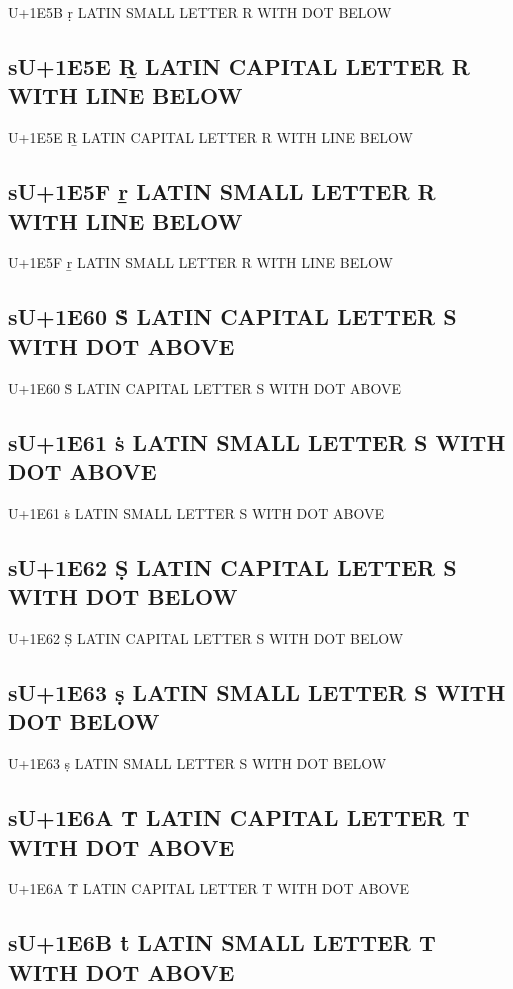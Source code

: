 U+1E5B ṛ LATIN SMALL LETTER R WITH DOT BELOW

\subsection{sU+1E5E Ṟ LATIN CAPITAL LETTER R WITH LINE BELOW}

U+1E5E Ṟ LATIN CAPITAL LETTER R WITH LINE BELOW

\subsection{sU+1E5F ṟ LATIN SMALL LETTER R WITH LINE BELOW}

U+1E5F ṟ LATIN SMALL LETTER R WITH LINE BELOW

\subsection{sU+1E60 Ṡ LATIN CAPITAL LETTER S WITH DOT ABOVE}

U+1E60 Ṡ LATIN CAPITAL LETTER S WITH DOT ABOVE

\subsection{sU+1E61 ṡ LATIN SMALL LETTER S WITH DOT ABOVE}

U+1E61 ṡ LATIN SMALL LETTER S WITH DOT ABOVE

\subsection{sU+1E62 Ṣ LATIN CAPITAL LETTER S WITH DOT BELOW}

U+1E62 Ṣ LATIN CAPITAL LETTER S WITH DOT BELOW

\subsection{sU+1E63 ṣ LATIN SMALL LETTER S WITH DOT BELOW}

U+1E63 ṣ LATIN SMALL LETTER S WITH DOT BELOW

\subsection{sU+1E6A Ṫ LATIN CAPITAL LETTER T WITH DOT ABOVE}

U+1E6A Ṫ LATIN CAPITAL LETTER T WITH DOT ABOVE

\subsection{sU+1E6B ṫ LATIN SMALL LETTER T WITH DOT ABOVE}

